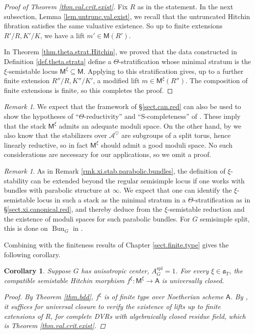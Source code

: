 \documentclass[openany]{amsbook}
\newtheorem{corollary}[theorem]{Corollary}
\theoremstyle{definition}
\theoremstyle{remark}
\newtheorem{remark}[theorem]{Remark}
\numberwithin{equation}{section}
\newcommand{\cA}{\mathcal{A}}
\renewcommand{\-}{\operatorname{-}}
\renewcommand{\a}{\mathfrak{a}}
\newcommand{\on}[1]{\operatorname{#1}}
\newcommand{\bM}{\mathsf{M}}
\newcommand{\bA}{\mathsf{A}}
\newcommand{\spl}{\mathrm{spl}}
\newcommand{\Bun}{\on{Bun}}
\begin{document}
\begin{proof}[Proof of Theorem \ref{thm.val.crit.exist}]
Fix $R$ as in the statement. In the next subsection, Lemma \ref{lem.untrunc.val.exist}, we recall that the untruncated Hitchin fibration satisfies the same valuative existence. So up to finite extensions $R'/R, K'/K$, we have a lift $m' \in \bM(R')$. 

In Theorem \ref{thm.theta.strat.Hitchin}, we proved that the data constructed in Definition \ref{def.theta.strata} define a $\Theta$-stratification whose minimal stratum is the $\xi$-semistable locus $\bM^{\xi} \subseteq \bM$. Applying \cite[Theorem 6.5]{AHLHModuliForStacks} to this stratification gives, up to a further finite extension $R''/R, K''/K'$, a modified lift $m \in \bM^{\xi}(R'')$. The composition of finite extensions is finite, so this completes the proof.
\end{proof}

\begin{remark}
    We expect that the framework of \S \ref{sect.can.red} can also be used to show the hypotheses of ``$\Theta$-reductivity'' and ``S-completeness'' of \cite[Theorem 5.4]{AHLHModuliForStacks}. These imply that the stack $\bM^{\xi}$ admits an adequate moduli space. On the other hand, by \cite[Corollaire 4.11.3]{ngofl} we also know that the stabilizers over $\cA^{\heartsuit}$ are subgroups of a split torus, hence linearly reductive, so in fact $\bM^{\xi}$ should admit a good moduli space. No such considerations are necessary for our applications, so we omit a proof.
\end{remark}

\begin{remark}
    As in Remark \ref{rmk.xi.stab.parabolic.bundles}, the definition of $\xi$-stability can be extended beyond the regular semisimple locus if one works with bundles with parabolic structure at $\infty$. We expect that one can identify the $\xi$-semistable locus in such a stack as the minimal stratum in a $\Theta$-stratification as in \S \ref{sect.xi.canonical.red}, and thereby deduce from \cite{AHLHModuliForStacks} the $\xi$-semistable reduction and the existence of moduli spaces for such parabolic bundles. For $G$ semisimple split, this is done on $\Bun_G$ in \cite{heinlothschmitt}.
\end{remark}

Combining with the finiteness results of Chapter \ref{sect.finite.type} gives the following corollary.
\begin{corollary}\label{cor.univ.closed}
    Suppose $G$ has anisotropic center, $A_G^{\spl} = 1$. For every $\xi \in \a_T$, the compatible semistable Hitchin morphism $f^\xi : \bM^\xi \to \bA$ is universally closed.
    \begin{proof}
        By Theorem \ref{thm.bdd}, $f^\xi$ is of finite type over Noetherian scheme $\bA$. By \cite[Th\'eor\`eme 7.10]{lmb}, it suffices for universal closure to verify the existence of lifts up to finite extensions of $R$, for complete DVRs with algebraically closed residue field, which is Theorem \ref{thm.val.crit.exist}.
    \end{proof}
\end{corollary}
\end{document}
